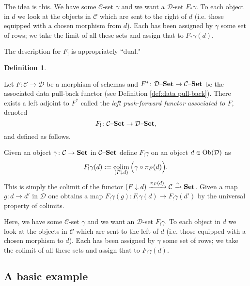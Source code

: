 \documentclass{amsart}
\def\tn{\textnormal}
\def\mc{\mathcal}
\def\Ob{\tn{Ob}}
\def\to{\rightarrow}
\def\taking{\colon}
\def\down{\downarrow}
\newcommand{\To}[1]{\xrightarrow{#1}}
\def\Set{{\bf Set}}
\def\set{{\text \textendash}{\bf Set}}
\def\colim{\mathop{\tn{colim}}}
\def\mcC{\mc{C}}
\def\mcD{\mc{D}}
\theoremstyle{remark}
\theoremstyle{definition}
\newtheorem{definition}[theorem]{Definition}
\begin{document}
The idea is this.  We have some $\mcC$-set $\gamma$ and we want a $\mcD$-set $F_*\gamma$.  To each object in $d$ we look at the objects in $\mcC$ which are sent to the right of $d$ (i.e. those equipped with a chosen morphism from $d$).  Each has been assigned by $\gamma$ some set of rows; we take the limit of all these sets and assign that to $F_*\gamma(d)$. 

The description for $F_!$ is appropriately ``dual."

\begin{definition}\label{def:left push}

Let $F\taking\mcC\to\mcD$ be a morphism of schemas and $F^*\taking\mcD\set\to\mcC\set$ be the associated data pull-back functor (see Definition \ref{def:data pull-back}).  There exists a left adjoint to $F^*$ called the {\em left push-forward functor associated to $F$}, denoted $$F_!\taking\mcC\set\to\mcD\set,$$ and defined as follows.

Given an object $\gamma\taking\mcC\to\Set$ in $\mcC\set$ define $F_!\gamma$ on an object $d\in\Ob(\mcD)$ as \begin{align}\label{dia:F_!}F_!\gamma(d):=\colim_{(F\down d)}\Big(\gamma\circ\pi_F(d)\Big).\end{align}  This is simply the colimit of the functor $(F\down d)\To{\pi_F(d)}\mcC\To{\gamma}\Set$.  Given a map $g\taking d\to d'$ in $\mcD$ one obtains a map $F_!\gamma(g)\taking F_!\gamma(d)\to F_!\gamma(d')$ by the universal property of colimits.

\end{definition}

Here, we have some $\mcC$-set $\gamma$ and we want an $\mcD$-set $F_!\gamma$.  To each object in $d$ we look at the objects in $\mcC$ which are sent to the left of $d$ (i.e. those equipped with a chosen morphism to $d$).  Each has been assigned by $\gamma$ some set of rows; we take the colimit of all these sets and assign that to $F_!\gamma(d)$. 
  
\subsection{A basic example}\label{sec:basic example}
\end{document}
